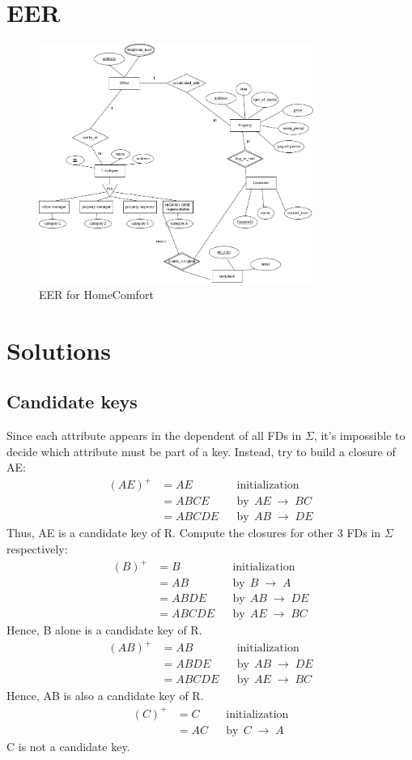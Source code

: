 \documentclass[12pt, a4paper]{article}
\newcommand{\mr}{\;\rightarrow\;}
\newcommand{\ms}{\:\:}
\begin{document}
\section{EER}
\begin{figure}[H]
  \centering
    \includegraphics[width=0.8\textwidth]{Q1}
  \caption{EER for HomeComfort}
\end{figure}

\section{Solutions}
\subsection{Candidate keys}
Since each attribute appears in the dependent of all FDs in \(\Sigma\), it's impossible to decide which attribute must be part of a key.  Instead, try to build a closure of AE:
\begin{align*}
  (AE)^{+} & = AE    && \text{initialization} \\
           & = ABCE  && \text{by}\ms AE \mr BC \\
           & = ABCDE && \text{by}\ms AB \mr DE
\end{align*}
Thus, AE is a candidate key of R.  Compute the closures for other 3 FDs in \(\Sigma\) respectively:
\begin{align*}
  (B)^{+} & = B    && \text{initialization} \\
          & = AB  && \text{by}\ms B \mr A \\
          & = ABDE && \text{by}\ms AB \mr DE \\
          & = ABCDE && \text{by}\ms AE \mr BC
\end{align*}
Hence, B alone is a candidate key of R.
\begin{align*}
  (AB)^{+} & = AB    && \text{initialization} \\
          & = ABDE  && \text{by}\ms AB \mr DE \\
          & = ABCDE && \text{by}\ms AE \mr BC
\end{align*}
Hence, AB is also a candidate key of R.
\begin{align*}
  (C)^{+} & = C    && \text{initialization} \\
          & = AC  && \text{by}\ms C \mr A
\end{align*}
C is not a candidate key.
\end{document}
